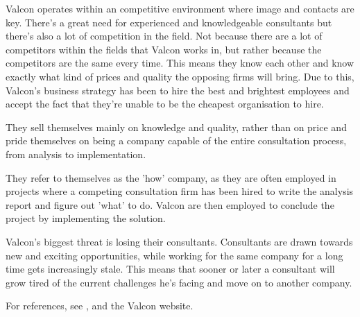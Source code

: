 \label{app:valcon_environment}
Valcon operates within an competitive environment where image and contacts are key. 
There's a great need for experienced and knowledgeable consultants but there's also a lot of competition in the field.
Not because there are a lot of competitors within the fields that Valcon works in, but rather because the competitors are the same every time.
This means they know each other and know exactly what kind of prices and quality the opposing firms will bring.
Due to this, Valcon's business strategy has been to hire the best and brightest employees and accept the fact that they're unable to be the cheapest organisation to hire.

They sell themselves mainly on knowledge and quality, rather than on price and pride themselves on being a company capable of the entire consultation process, from analysis to implementation.

They refer to themselves as the 'how' company, as they are often employed in projects where a competing consultation firm has been hired to write the analysis report and figure out 'what' to do. 
Valcon are then employed to conclude the project by implementing the solution.

Valcon's biggest threat is losing their consultants.
Consultants are drawn towards new and exciting opportunities, while working for the same company for a long time gets increasingly stale.
This means that sooner or later a consultant will grow tired of the current challenges he's facing and move on to another company.

For references, see ,  and the Valcon website.